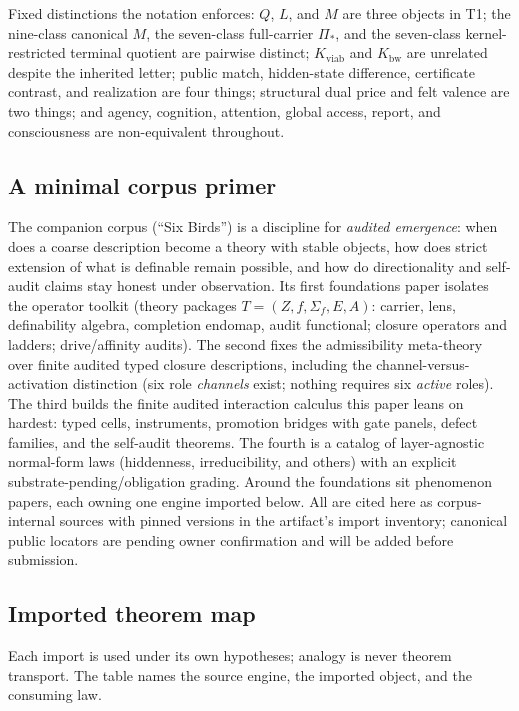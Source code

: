 \documentclass[11pt]{article}
\newcommand{\Kviab}{K_{\mathrm{viab}}}
\newcommand{\Kbw}{K_{\mathrm{bw}}}
\theoremstyle{definition}
\begin{document}
Fixed distinctions the notation enforces: $Q$, $L$, and $M$ are three objects
in T1; the nine-class canonical $M$, the seven-class full-carrier $\Pi_*$, and
the seven-class kernel-restricted terminal quotient are pairwise distinct;
$\Kviab$ and $\Kbw$ are unrelated despite the inherited letter; public match,
hidden-state difference, certificate contrast, and realization are four
things; structural dual price and felt valence are two things; and agency,
cognition, attention, global access, report, and consciousness are
non-equivalent throughout.

\subsection{A minimal corpus primer}

The companion corpus (``Six Birds'') is a discipline for \emph{audited
emergence}: when does a coarse description become a theory with stable
objects, how does strict extension of what is definable remain possible, and
how do directionality and self-audit claims stay honest under observation.
Its first foundations paper isolates the operator toolkit (theory packages
$T = (Z, f, \Sigma_f, E, A)$: carrier, lens, definability algebra, completion
endomap, audit functional; closure operators and ladders; drive/affinity
audits). The second fixes the admissibility meta-theory over finite audited
typed closure descriptions, including the channel-versus-activation
distinction (six role \emph{channels} exist; nothing requires six
\emph{active} roles). The third builds the finite audited interaction
calculus this paper leans on hardest: typed cells, instruments,
promotion bridges with gate panels, defect families, and the self-audit
theorems. The fourth is a catalog of layer-agnostic normal-form laws
(hiddenness, irreducibility, and others) with an explicit
substrate-pending/obligation grading. Around the foundations sit
phenomenon papers, each owning one engine imported below. All are cited here
as corpus-internal sources with pinned versions in the artifact's import
inventory; canonical public locators are pending owner confirmation and will
be added before submission.

\subsection{Imported theorem map}

Each import is used under its own hypotheses; analogy is never theorem
transport. The table names the source engine, the imported object, and the
consuming law.
\end{document}
